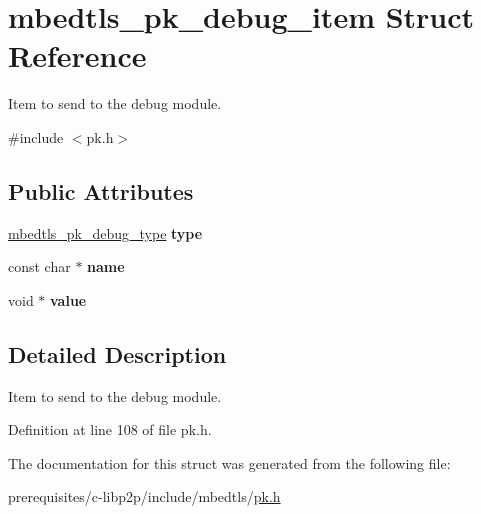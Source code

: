 \hypertarget{structmbedtls__pk__debug__item}{}\section{mbedtls\+\_\+pk\+\_\+debug\+\_\+item Struct Reference}
\label{structmbedtls__pk__debug__item}


Item to send to the debug module.  




{\ttfamily \#include $<$pk.\+h$>$}

\subsection*{Public Attributes}
\begin{DoxyCompactItemize}
\item 
\mbox{\label{structmbedtls__pk__debug__item_ae9d86be304da9a0adea3ad93216c2a97}} 
\mbox{\hyperlink{pk_8h_a959c5419b3dd34df5420ee83bbc54002}{mbedtls\+\_\+pk\+\_\+debug\+\_\+type}} {\bfseries type}
\item 
\mbox{\label{structmbedtls__pk__debug__item_a708ff418333bcfb0be9ef97d7b9d396c}} 
const char $\ast$ {\bfseries name}
\item 
\mbox{\label{structmbedtls__pk__debug__item_a1f5c5650c738f698d1bf34011996e5f2}} 
void $\ast$ {\bfseries value}
\end{DoxyCompactItemize}


\subsection{Detailed Description}
Item to send to the debug module. 

Definition at line 108 of file pk.\+h.



The documentation for this struct was generated from the following file\+:\begin{DoxyCompactItemize}
\item 
prerequisites/c-\/libp2p/include/mbedtls/\mbox{\hyperlink{pk_8h}{pk.\+h}}\end{DoxyCompactItemize}
